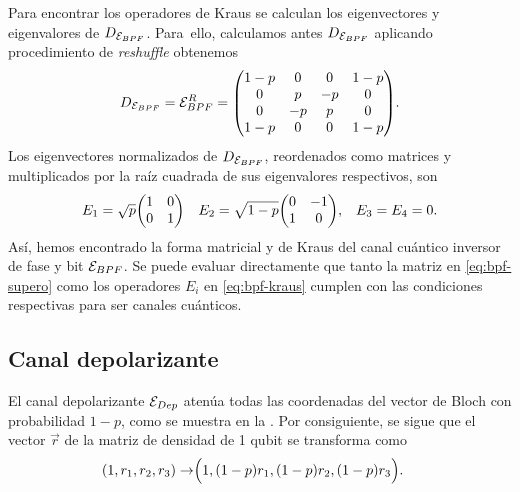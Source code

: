 Para encontrar los operadores de Kraus se calculan los eigenvectores
y eigenvalores de $D_{\mathcal{E}_{BPF}}$. Para~ello, calculamos antes
$D_{\mathcal{E}_{BPF}}$ aplicando procedimiento de \textit{reshuffle} obtenemos
\begin{align}
  D_{\E_{BPF}}=\E_{BPF}^R=
  \mqty(
	 1-p & 0 & 0 & 1-p \\
	 0 & p & -p & 0 \\
	 0 & -p & p & 0 \\
	 1-p & 0 & 0 & 1-p
  ).
  \label{eq:Choi-E_bpf}
\end{align}
Los eigenvectores normalizados de $D_{\mathcal{E}_{BPF}}$, 
reordenados como matrices y multiplicados por 
la raíz cuadrada de sus eigenvalores respectivos, son
\begin{align}
E_1&=
\sqrt{p}
\mqty(
1 & 0\\
0 & 1
)&
E_2&=
\sqrt{1-p}
\mqty(
0 & -1\\
1 & 0
),
&E_3=E_4=0.
\label{eq:bpf-kraus}
\end{align}
Así, hemos encontrado la forma matricial y de Kraus del canal
cuántico inversor de fase y bit $\mathcal{E}_{BPF}$. Se puede evaluar directamente que 
tanto la matriz en \eqref{eq:bpf-supero} como los operadores $E_i$
en \eqref{eq:bpf-kraus} cumplen con las condiciones respectivas
para ser canales cuánticos.

\subsection{Canal depolarizante} %
El canal depolarizante $\mathcal{E}_{Dep}$ 
atenúa todas las coordenadas 
del vector de Bloch con probabilidad  $1-p$, como se muestra
en la . Por consiguiente, 
se sigue que el vector $\vec{r}$ de la matriz 
de densidad de 1 qubit se transforma como \cite{nielsen_chuang_2011}
\begin{align}
\qty(1,r_1,r_2,r_3)\rightarrow&\Big(1,\qty(1-p)r_1,\qty(1-p)r_2,\qty(1-p)r_3\Big).
\label{eq:depolarizing-bloch-vec}
\end{align}

